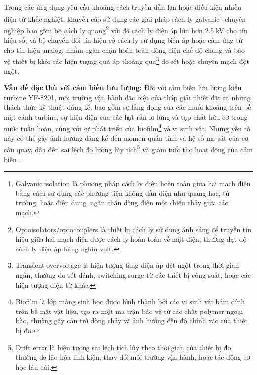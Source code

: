 \documentclass[../main.tex]{subfiles}
\begin{document}
Trong các ứng dụng yêu cầu khoảng cách truyền dẫn lớn hoặc điều kiện nhiễu điện từ khắc nghiệt, khuyến cáo sử dụng các giải pháp cách ly galvanic\footnote{Galvanic isolation là phương pháp cách ly điện hoàn toàn giữa hai mạch điện bằng cách sử dụng các phương tiện không dẫn điện như quang học, từ trường, hoặc điện dung, ngăn chặn dòng điện một chiều chảy giữa các mạch.} chuyên nghiệp bao gồm bộ cách ly quang\footnote{Optoisolators/optocouplers là thiết bị cách ly sử dụng ánh sáng để truyền tín hiệu giữa hai mạch điện được cách ly hoàn toàn về mặt điện, thường đạt độ cách ly điện áp hàng nghìn volt.} với độ cách ly điện áp lớn hơn 2.5 kV cho tín hiệu số, và bộ chuyển đổi tín hiệu có cách ly sử dụng biến áp hoặc cảm ứng từ cho tín hiệu analog, nhằm ngăn chặn hoàn toàn dòng điện chế độ chung và bảo vệ thiết bị khỏi các hiện tượng quá áp thoáng qua\footnote{Transient overvoltage là hiện tượng tăng điện áp đột ngột trong thời gian ngắn, thường do sét đánh, switching surge từ các thiết bị công suất, hoặc các hiện tượng điện từ khác.} do sét hoặc chuyển mạch đột ngột.

\textbf{Vấn đề đặc thù với cảm biến lưu lượng:} Đối với cảm biến lưu lượng kiểu turbine YF-S201, môi trường vận hành đặc biệt của tháp giải nhiệt đặt ra những thách thức kỹ thuật đáng kể, bao gồm sự lắng đọng của các muối khoáng trên bề mặt cánh turbine, sự hiện diện của các hạt rắn lơ lửng và tạp chất hữu cơ trong nước tuần hoàn, cùng với sự phát triển của biofilm\footnote{Biofilm là lớp màng sinh học được hình thành bởi các vi sinh vật bám dính trên bề mặt vật liệu, tạo ra một ma trận bảo vệ từ các chất polymer ngoại bào, thường gây cản trở dòng chảy và ảnh hưởng đến độ chính xác của thiết bị đo.} và vi sinh vật. Những yếu tố này có thể gây ảnh hưởng đáng kể đến momen quán tính và hệ số ma sát của cơ cấu quay, dẫn đến sai lệch đo lường lũy tích\footnote{Drift error là hiện tượng sai lệch tích lũy theo thời gian của thiết bị đo, thường do lão hóa linh kiện, thay đổi môi trường vận hành, hoặc tác động cơ học lâu dài.} và giảm tuổi thọ hoạt động của cảm biến \cite{datasheet_YFS201,epa_watersense_cooling_towers_2012}. 
\end{document}
